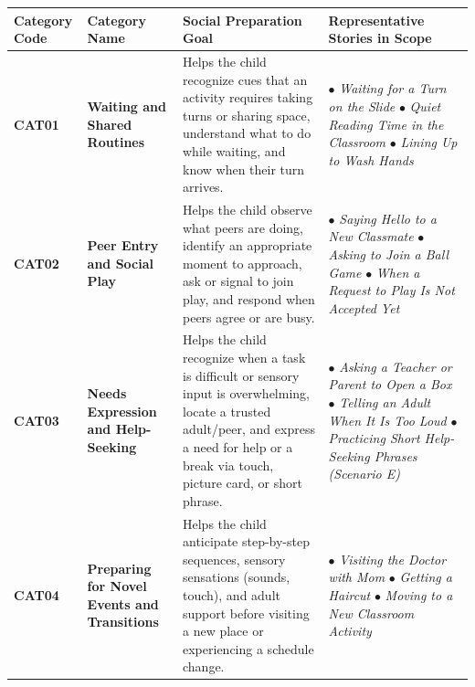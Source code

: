 \noindent\begin{xltabular}{\textwidth}{|p{2.0cm}|p{3.2cm}|X|p{2.8cm}|}
\hline
\textbf{Category Code} & \textbf{Category Name} & \textbf{Social Preparation Goal} & \textbf{Representative Stories in Scope} \\ \hline
\endhead
\textbf{CAT01} & \textbf{Waiting and Shared Routines} & Helps the child recognize cues that an activity requires taking turns or sharing space, understand what to do while waiting, and know when their turn arrives. & $\bullet$ \textit{Waiting for a Turn on the Slide} \newline $\bullet$ \textit{Quiet Reading Time in the Classroom} \newline $\bullet$ \textit{Lining Up to Wash Hands} \\ \hline
\textbf{CAT02} & \textbf{Peer Entry and Social Play} & Helps the child observe what peers are doing, identify an appropriate moment to approach, ask or signal to join play, and respond when peers agree or are busy. & $\bullet$ \textit{Saying Hello to a New Classmate} \newline $\bullet$ \textit{Asking to Join a Ball Game} \newline $\bullet$ \textit{When a Request to Play Is Not Accepted Yet} \\ \hline
\textbf{CAT03} & \textbf{Needs Expression and Help-Seeking} & Helps the child recognize when a task is difficult or sensory input is overwhelming, locate a trusted adult/peer, and express a need for help or a break via touch, picture card, or short phrase. & $\bullet$ \textit{Asking a Teacher or Parent to Open a Box} \newline $\bullet$ \textit{Telling an Adult When It Is Too Loud} \newline $\bullet$ \textit{Practicing Short Help-Seeking Phrases (Scenario E)} \\ \hline
\textbf{CAT04} & \textbf{Preparing for Novel Events and Transitions} & Helps the child anticipate step-by-step sequences, sensory sensations (sounds, touch), and adult support before visiting a new place or experiencing a schedule change. & $\bullet$ \textit{Visiting the Doctor with Mom} \newline $\bullet$ \textit{Getting a Haircut} \newline $\bullet$ \textit{Moving to a New Classroom Activity} \\ \hline
\end{xltabular}



